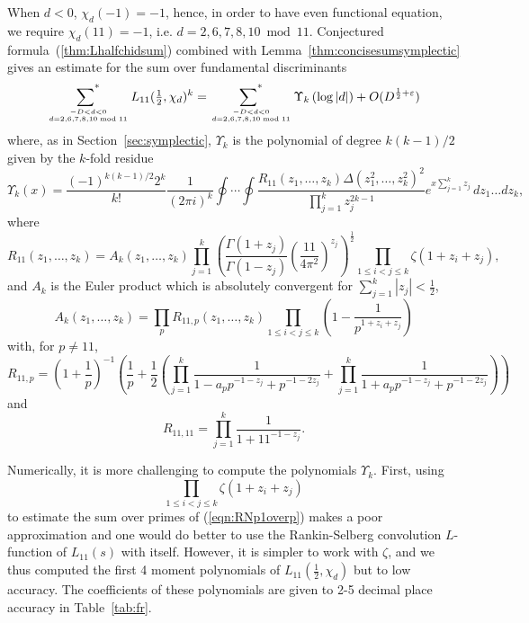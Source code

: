 \documentclass[12pt,letterpaper]{amsart}
\theoremstyle{plain}
\theoremstyle{definition}
\theoremstyle{remark}
\numberwithin{equation}{subsection}
\numberwithin{theorem}{subsection}
\numberwithin{table}{subsection}
\newcommand{\ontop}[2]{\genfrac{}{}{0pt}{}{#1}{#2}}
\renewcommand{\mod}{\bmod}
\def\sumstar{\operatornamewithlimits{\sum\nolimits^*}}
\begin{document}
When $d<0$, $\chi_d(-1)=-1$, hence, in order to have even
functional equation, we require $\chi_d(11)=-1$, i.e.
$d=2,6,7,8,10 \mod 11$.
Conjectured formula~(\ref{thm:Lhalfchidsum}) combined with Lemma~\ref{thm:concisesumsymplectic}
gives an estimate for the sum over fundamental discriminants
\begin{equation}
     \sumstar_{ \ontop{-D<d<0}{d =  2,6,7,8,10 \mod 11} }
      L_{11}(\tfrac12 ,\chi_d)^k
      = \sumstar_{\ontop{-D<d<0}{d =  2,6,7,8,10 \mod 11}}
        \Upsilon_k\left(\log{|d|}\right)
        +O(D^{\frac12 + \varepsilon})
\label{eqn:L11sum}
\end{equation}
where, as in Section~\ref{sec:symplectic},  $\Upsilon_k$ is the polynomial of degree $k(k-1)/2$ given by
the $k$-fold residue
\begin{equation}
\Upsilon_k(x)=\frac{(-1)^{k(k-1)/2}2^k}{k!} \frac{1}{(2\pi i)^{k}}
\oint \cdots \oint \frac{R_{11}(z_1,
\dots,z_{k})\Delta(z_1^2,\dots,z_{k}^2)^2} {\displaystyle
\prod_{j=1}^{k} z_j^{2k-1}} e^{x \sum_{j=1}^{k}z_j}\,dz_1\dots
dz_{k} ,
\end{equation}
where
\begin{equation}
R_{11}(z_1,\dots,z_k)=A_k(z_1,\dots,z_k)
\prod_{j=1}^k
\left(
    \frac{\Gamma(1+z_j)}
         {\Gamma(1-z_j)}
    \left(\frac{11}{4\pi^2} \right)^{z_j}
\right)^{\frac 12} \prod_{1\le i < j\le k}\zeta(1+z_i+z_j),
\end{equation}
and $A_k$ is the Euler product which is absolutely convergent for
$\sum_{j=1}^k |z_j|<\frac12 $,
\begin{equation}
A_k(z_1,\dots,z_k) =
    \prod_p R_{11,p}(z_1,\ldots,z_k)
    \prod_{1\le i < j \le k}
    \left(1-\frac{1}{p^{1+z_i+z_j}}\right)
\end{equation}
with, for $p \neq 11$,
\begin{equation}
R_{11,p} =
           \left(1+\frac 1 p\right)^{-1}
           \left(\frac 1 p +\frac{1}{2}
              \left(
                 \prod_{j=1}^k
                 \frac{1}{1-a_pp^{-1-z_j}+p^{-1-2z_j}}
               + \prod_{j=1}^k
                 \frac{1}{1+a_pp^{-1-z_j}+p^{-1-2z_j}}
              \right)
           \right)
\end{equation}
and
\begin{equation}
    R_{11,11} =
    \prod_{j=1}^k  \frac{1}{1+11^{-1-z_j}}.
\end{equation}

Numerically, it is more challenging to compute the polynomials
$\Upsilon_k$. First, using
\begin{equation}
    \prod_{1\le i < j\le k}\zeta(1+z_i+z_j)
\end{equation}
to estimate the sum over primes of (\ref{eqn:RNp1overp}) makes a poor
approximation and one would do better to use the Rankin-Selberg
convolution $L$-function of $L_{11}(s)$ with itself. However, it
is simpler to work with $\zeta$, and we thus computed the first 4
moment polynomials of $L_{11}(\frac12 ,\chi_d)$ but to low accuracy.
The coefficients of these polynomials are given to 2-5 decimal
place accuracy in Table~\ref{tab:fr}.
\end{document}
